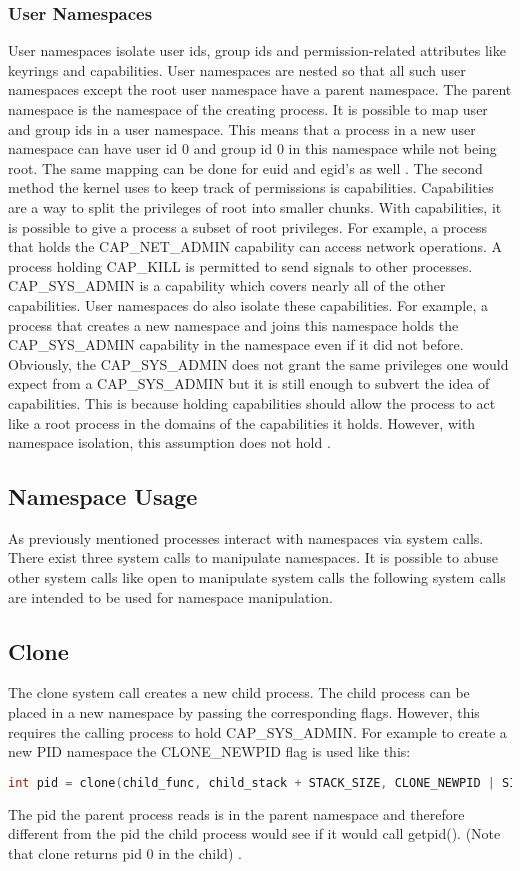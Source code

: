 \documentclass[10pt,twocolumn,a4paper]{article}
\begin{document}
\subsubsection{User Namespaces}
User namespaces isolate user ids, group ids and permission-related attributes like keyrings and
capabilities. User namespaces are nested so that all such user namespaces except the root user namespace
have a parent namespace. The parent namespace is the namespace of the creating process. 
It is possible to map user and group ids in a user namespace. This means that a process in a new user
namespace can have user id 0 and group id 0 in this namespace while not being root. The same mapping
can be done for euid and egid's as well \cite{18}. The second method the kernel uses to keep track
of permissions is capabilities. Capabilities are a way to split the privileges of root into smaller
chunks. With capabilities, it is possible to give a process a subset of root
privileges. For example, a process that holds the CAP\_NET\_ADMIN capability can access network
operations. A process holding CAP\_KILL is permitted to send signals to other
processes\cite{19}. CAP\_SYS\_ADMIN is a capability which covers nearly all of the other capabilities. 
User namespaces do also isolate these capabilities. For example, a process that creates a new
namespace and joins this namespace holds the CAP\_SYS\_ADMIN capability in the namespace even if it did not before. 
Obviously, the CAP\_SYS\_ADMIN does not grant the same privileges one would expect from
a CAP\_SYS\_ADMIN but it is still enough to subvert the idea of capabilities. This is because holding capabilities should allow
the process to act like a root process in the domains of the capabilities it holds. However, with namespace isolation, this assumption
does not hold   \cite{20}. 

\subsection{Namespace Usage}
As previously mentioned processes interact with namespaces via system calls. There exist three system calls
to manipulate namespaces. It is possible to abuse other system calls like open to
manipulate system calls the following system calls are intended to be used for namespace manipulation.  
\subsection{ Clone}
The clone system call creates a new child process. The child process can be placed in a new
namespace by passing the corresponding flags. However, this requires the calling process to hold
CAP\_SYS\_ADMIN. For example to create a new PID namespace the CLONE\_NEWPID flag is used like this:
\begin{lstlisting}[language=C]
    int pid = clone(child_func, child_stack + STACK_SIZE, CLONE_NEWPID | SIGCHLD, NULL);
\end{lstlisting}
The pid the parent process reads is in the parent namespace and therefore different from the pid the
child process would see if it would call getpid(). (Note that clone returns pid 0 in the
child) \cite{22}.
\end{document}
